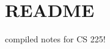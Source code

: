 \chapter{README }
\hypertarget{md__r_e_a_d_m_e}{}\label{md__r_e_a_d_m_e}
compiled notes for CS 225! 